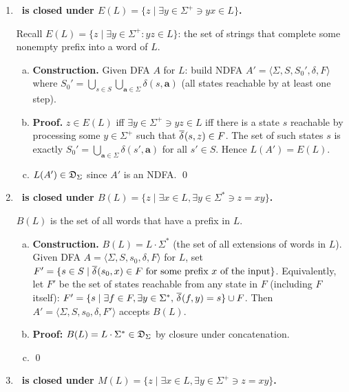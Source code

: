 \begin{enumerate}[{5.}1. ]
\item \textbf{\DSIG\ is closed under $E(L)=\{z\mid\exists y\in\Sigma^+\ni yx\in L\}$.}

Recall $E(L)=\{z\mid\exists y\in\Sigma^+: yz\in L\}$: the set of strings that complete some nonempty prefix into a word of $L$.

\begin{enumerate}[(a)]
  \item \textbf{Construction.}  Given DFA $A$ for $L$: build NDFA $A'=\langle\Sigma,S,S_0',\delta,F\rangle$ where $S_0'=\bigcup_{s\in S}\bigcup_{\pmb{a}\in\Sigma}\delta(s,\pmb{a})$ (all states reachable by at least one step).

  \item \textbf{Proof.}  $z\in E(L)$ iff $\exists y\in\Sigma^+\ni yz\in L$ iff there is a state $s$ reachable by processing some $y\in\Sigma^+$ such that $\overline{\delta^{}}(s,z)\in F$.  The set of such states $s$ is exactly $S_0'=\bigcup_{\pmb{a}\in\Sigma}\delta(s',\pmb{a})$ for all $s'\in S$.  Hence $L(A')=E(L)$.

  \item $L(A')\in\mathfrak{D}_\Sigma$ since $A'$ is an NDFA. \qed
\end{enumerate}

\item \textbf{\DSIG\ is closed under $B(L)=\{z\mid\exists x\in L,\exists y\in\Sigma^*\ni z=xy\}$.}

$B(L)$ is the set of all words that have a prefix in $L$.

\begin{enumerate}[(a)]
  \item \textbf{Construction.}  $B(L)=L\cdot\Sigma^*$ (the set of all extensions of words in $L$).  Given DFA $A=\langle\Sigma,S,s_0,\delta,F\rangle$ for $L$, set $F'=\{s\in S\mid \overline{\delta^{}}(s_0,x)\in F\text{ for some prefix }x\text{ of the input}\}$.  Equivalently, let $F'$ be the set of states reachable from any state in $F$ (including $F$ itself): $F'=\{s\mid\exists f\in F,\exists y\in\Sigma^*,\,\overline{\delta^{}}(f,y)=s\}\cup F$.  Then $A'=\langle\Sigma,S,s_0,\delta,F'\rangle$ accepts $B(L)$.

  \item \textbf{Proof:} $B(L)=L\cdot\Sigma^*\in\mathfrak{D}_\Sigma$ by closure under concatenation.

  \item \qed
\end{enumerate}

\item \textbf{\DSIG\ is closed under $M(L)=\{z\mid\exists x\in L,\exists y\in\Sigma^+\ni z=xy\}$.}


\end{enumerate}
